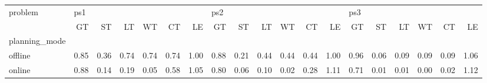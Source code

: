 \begin{tabular}{lrrrrrrrrrrrrrrrrrr}
\toprule
problem & \multicolumn{6}{l}{ps1} & \multicolumn{6}{l}{ps2} & \multicolumn{6}{l}{ps3} \\
{} &   GT &   ST &   LT &   WT &   CT &   LE &   GT &   ST &   LT &   WT &   CT &   LE &   GT &   ST &   LT &   WT &   CT &   LE \\
planning\_mode &      &      &      &      &      &      &      &      &      &      &      &      &      &      &      &      &      &      \\
\midrule
offline       & 0.85 & 0.36 & 0.74 & 0.74 & 0.74 & 1.00 & 0.88 & 0.21 & 0.44 & 0.44 & 0.44 & 1.00 & 0.96 & 0.06 & 0.09 & 0.09 & 0.09 & 1.06 \\
online        & 0.88 & 0.14 & 0.19 & 0.05 & 0.58 & 1.05 & 0.80 & 0.06 & 0.10 & 0.02 & 0.28 & 1.11 & 0.71 & 0.01 & 0.01 & 0.00 & 0.02 & 1.12 \\
\bottomrule
\end{tabular}
